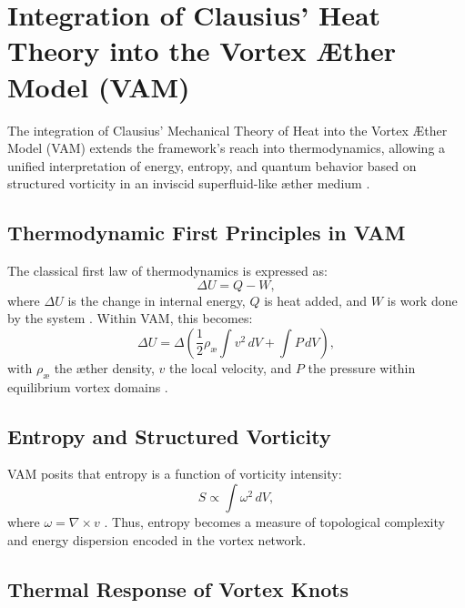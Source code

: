 

\section{Integration of Clausius' Heat Theory into the Vortex \AE ther Model (VAM)}

The integration of Clausius' Mechanical Theory of Heat into the Vortex \AE ther Model (VAM) extends the framework's reach into thermodynamics,
allowing a unified interpretation of energy, entropy, and quantum behavior based on structured vorticity in an inviscid superfluid-like \ae ther
medium \cite{clausius1865mechanical, maxwell1865electromagnetic, helmholtz1858integrals}.

\subsection{Thermodynamic First Principles in VAM}

The classical first law of thermodynamics is expressed as:
\begin{equation}
\Delta U = Q - W,\label{eq:first_law_thermodynamics}
\end{equation}
where $\Delta U$ is the change in internal energy, $Q$ is heat added, and $W$ is work done by the system \cite{clausius1865mechanical}. Within VAM, this becomes:
\begin{equation}
\Delta U = \Delta \left( \frac{1}{2} \rho_{\text{\ae}} \int v^2 \, dV + \int P \, dV \right),\label{eq:first_law_vam}
\end{equation}
with $\rho_{\text{\ae}}$ the æther density, $v$ the local velocity, and $P$ the pressure within equilibrium vortex domains \cite{vam2025unified}.

\subsection{Entropy and Structured Vorticity}

VAM posits that entropy is a function of vorticity intensity:
\begin{equation}
S \propto \int \omega^2 \, dV,\label{eq:entropy_vorticity}
\end{equation}
where $\omega = \nabla \times v$ \cite{kelvin1867vortex}. Thus, entropy becomes a measure of topological complexity and energy dispersion encoded in the vortex network.

\subsection{Thermal Response of Vortex Knots}

